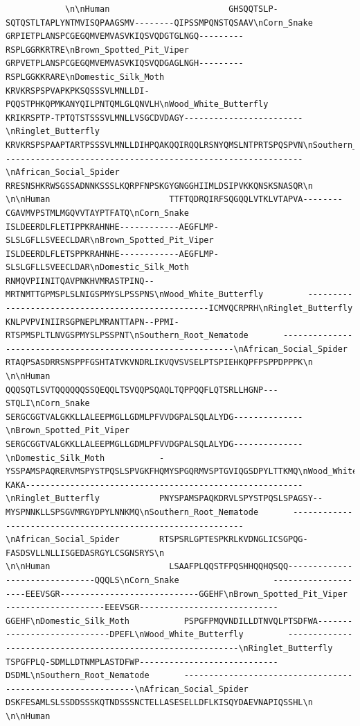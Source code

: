 \documentclass[
  letterpaper,
  DIV=11,
  numbers=noendperiod]{scrartcl}
\begin{document}
\begin{verbatim}
            \n\nHuman                        GHSQQTSLP-SQTQSTLTAPLYNTMVISQPAAGSMV--------QIPSSMPQNSTQSAAV\nCorn_Snake                   GRPIETPLANSPCGEGQMVEMVASVKIQSVQDGTGLNGQ---------RSPLGGRKRTRE\nBrown_Spotted_Pit_Viper      GRPVETPLANSPCGEGQMVEMVASVKIQSVQDGAGLNGH---------RSPLGGKKRARE\nDomestic_Silk_Moth           KRVKRSPSPVAPKPKSQSSSVLMNLLDI-PQQSTPHKQPMKANYQILPNTQMLGLQNVLH\nWood_White_Butterfly         KRIKRSPTP-TPTQTSTSSSVLMNLLVSGCDVDAGY------------------------\nRinglet_Butterfly            KRVKRSPSPAAPTARTPSSSVLMNLLDIHPQAKQQIRQQLRSNYQMSLNTPRTSPQSPVN\nSouthern_Root_Nematode       ------------------------------------------------------------\nAfrican_Social_Spider        RRESNSHKRWSGSSADNNKSSSLKQRPFNPSKGYGNGGHIIMLDSIPVKKQNSKSNASQR\n                                                                                         \n\nHuman                        TTFTQDRQIRFSQGQQLVTKLVTAPVA--------CGAVMVPSTMLMGQVVTAYPTFATQ\nCorn_Snake                   ISLDEERDLFLETIPPKRAHNHE------------AEGFLMP-SLSLGFLLSVEECLDAR\nBrown_Spotted_Pit_Viper      ISLDEERDLFLETSPPKRAHNHE------------AEGFLMP-SLSLGFLLSVEECLDAR\nDomestic_Silk_Moth           RNMQVPIINITQAVPNKHVMRASTPINQ--MRTNMTTGPMSPLSLNIGSPMYSLPSSPNS\nWood_White_Butterfly         --------------------------------------------------ICMVQCRPRH\nRinglet_Butterfly            KNLPVPVINIIRSGPNEPLMRANTTAPN--PPMI-RTSPMSPLTLNVGSPMYSLPSSPNT\nSouthern_Root_Nematode       ------------------------------------------------------------\nAfrican_Social_Spider        RTAQPSASDRRSNSPPFGSHTATVKVNDRLIKVQVSVSELPTSPIEHKQPFPSPPDPPPK\n                                                                                         \n\nHuman                        QQQSQTLSVTQQQQQQSSQEQQLTSVQQPSQAQLTQPPQQFLQTSRLLHGNP---STQLI\nCorn_Snake                   SERGCGGTVALGKKLLALEEPMGLLGDMLPFVVDGPALSQLALYDG--------------\nBrown_Spotted_Pit_Viper      SERGCGGTVALGKKLLALEEPMGLLGDMLPFVVDGPALSQLALYDG--------------\nDomestic_Silk_Moth           -YSSPAMSPAQRERVMSPYSTPQSLSPVGKFHQMYSPGQRMVSPTGVIQGSDPYLTTKMQ\nWood_White_Butterfly         KAKA--------------------------------------------------------\nRinglet_Butterfly            PNYSPAMSPAQKDRVLSPYSTPQSLSPAGSY--MYSPNNKLLSPSGVMRGYDPYLNNKMQ\nSouthern_Root_Nematode       ------------------------------------------------------------\nAfrican_Social_Spider        RTSPSRLGPTESPKRLKVDNGLICSGPQG-FASDSVLLNLLISGEDASRGYLCSGNSRYS\n                                                                                         \n\nHuman                        LSAAFPLQQSTFPQSHHQQHQSQQ-------------------------------QQQLS\nCorn_Snake                   --------------------EEEVSGR----------------------------GGEHF\nBrown_Spotted_Pit_Viper      --------------------EEEVSGR----------------------------GGEHF\nDomestic_Silk_Moth           PSPGFPMQVNDILLDTNVQLPTSDFWA----------------------------DPEFL\nWood_White_Butterfly         ------------------------------------------------------------\nRinglet_Butterfly            TSPGFPLQ-SDMLLDTNMPLASTDFWP----------------------------DSDML\nSouthern_Root_Nematode       ------------------------------------------------------------\nAfrican_Social_Spider        DSKFESAMLSLSSDDSSSKQTNDSSSNCTELLASESELLDFLKISQYDAEVNAPIQSSHL\n                                                                                         \n\nHuman              
\end{verbatim}
\end{document}
